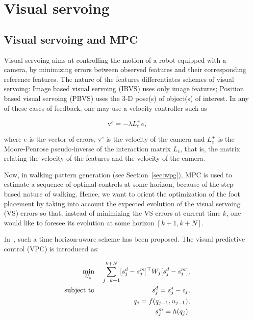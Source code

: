 \chapter{Visual servoing} 
\label{Chap:Visual-Servoing}


\section{Visual servoing and MPC}

\label{sec:vs}

Visual servoing aims at controlling the motion of a robot equipped with a camera, by minimizing errors between observed features and their corresponding reference features. The nature of the features differentiates schemes of visual servoing: Image based visual servoing (IBVS) uses only image features; Position based visual servoing (PBVS) uses the 3-D pose(s) of object(s) of interest. In any of these cases of feedback, one may use a velocity controller such as

$$
\text{v}^c = -\lambda L_e^{+}e,
$$

where $e$ is the vector of errors, $\text{v}^c$ is the velocity of the camera and $L_e^{+}$ is the Moore-Penrose pseudo-inverse of the interaction matrix $L_e$, that is, the matrix relating the velocity of the features and the velocity of the camera.

Now, in walking pattern generation (see Section~\ref{sec:wpg}), MPC is used to estimate a sequence of optimal controls at some horizon, because of the step-based nature of walking. Hence, we want to orient the optimization of the foot placement by taking into account the expected evolution of the visual servoing (VS) errors so that, instead of minimizing the VS errors at current time $k$, one would like to foresee its evolution at some horizon $[k+1,k+N]$. 

In~\cite{Allibert2010}, such a time horizon-aware scheme has been proposed. The visual predictive control (VPC) is introduced as:

\begin{eqnarray}
\label{Eq:MinVisualFeatures}
 \min_{U_{k}} \;&& \sum\limits_{j=k+1}^{k+N} [s^d_j - s^m_j]^{\top} W_j [s^d_j - s^m_j], \\
 \mbox{subject to} \; && s^d_j = s^{*}_j - \epsilon_j, \\
 \label{Eq:ConstraintDynamicModel}
 && q_j = f(q_{j-1},u_{j-1}), \\
 \label{Eq:ConstraintProjection}
 && s^m_j = h(q_j).
\end{eqnarray}

